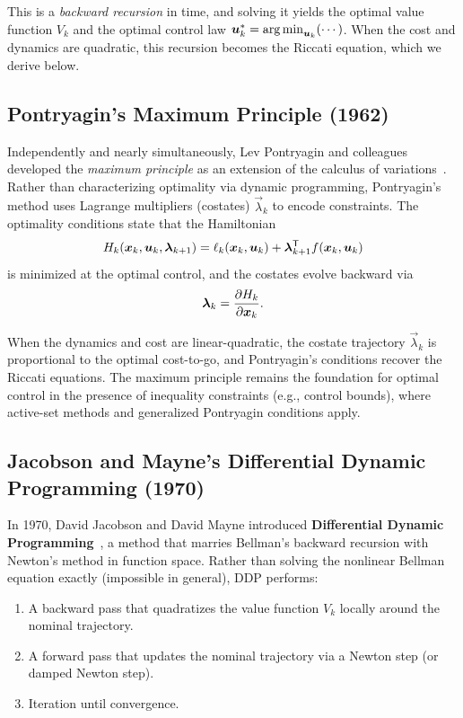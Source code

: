 This is a \emph{backward recursion} in time, and solving it yields the optimal value function $V_k$
and the optimal control law $\bm{u}_k^* = \operatorname*{arg\,min}_{\bm{u}_k} (\cdots)$. When the cost and dynamics are
quadratic, this recursion becomes the Riccati equation, which we derive below.

\subsection{Pontryagin's Maximum Principle (1962)}

Independently and nearly simultaneously, Lev Pontryagin and colleagues developed the \emph{maximum principle}
as an extension of the calculus of variations~\cite{pontryagin1962}. Rather than characterizing optimality
via dynamic programming, Pontryagin's method uses Lagrange multipliers (costates) $\vec{\lambda}_k$ to encode
constraints. The optimality conditions state that the Hamiltonian
\begin{equation}
H_k(\bm{x}_k,\bm{u}_k,\bm{\lambda}_{k+1}) = \ell_k(\bm{x}_k,\bm{u}_k) + \bm{\lambda}_{k+1}^{\mathsf{T}} f(\bm{x}_k,\bm{u}_k)
\label{eq:ch5:hamiltonian-discrete}
\end{equation}
is minimized at the optimal control, and the costates evolve backward via
\begin{equation}
\bm{\lambda}_k = \frac{\partial H_k}{\partial \bm{x}_k}.
\label{eq:ch5:costate-update}
\end{equation}

When the dynamics and cost are linear-quadratic, the costate trajectory $\vec{\lambda}_k$ is proportional
to the optimal cost-to-go, and Pontryagin's conditions recover the Riccati equations. The maximum principle
remains the foundation for optimal control in the presence of inequality constraints (e.g., control bounds),
where active-set methods and generalized Pontryagin conditions apply.

\subsection{Jacobson and Mayne's Differential Dynamic Programming (1970)}

In 1970, David Jacobson and David Mayne introduced \textbf{Differential Dynamic Programming}~\cite{jacobson1970dpp},
a method that marries Bellman's backward recursion with Newton's method in function space. Rather than solving
the nonlinear Bellman equation exactly (impossible in general), DDP performs:
\begin{enumerate}
\item A backward pass that quadratizes the value function $V_k$ locally around the nominal trajectory.
\item A forward pass that updates the nominal trajectory via a Newton step (or damped Newton step).
\item Iteration until convergence.
\end{enumerate}

